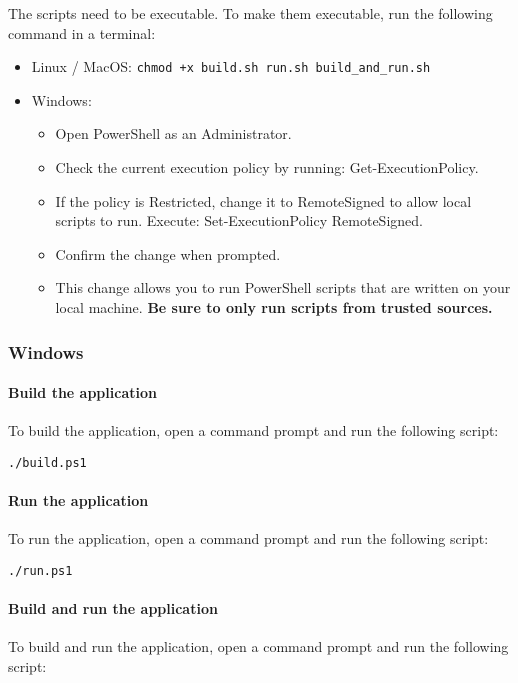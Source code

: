 \begin{bfhWarnBox}
	The scripts need to be executable. To make them executable, run the following command in a terminal:
	\begin{itemize}
		\item Linux / MacOS: \texttt{chmod +x build.sh run.sh build\_and\_run.sh}
		\item Windows: 
		\begin{itemize}
			\item Open PowerShell as an Administrator. 
			\item Check the current execution policy by running: Get-ExecutionPolicy. 
			\item If the policy is Restricted, change it to RemoteSigned to allow local scripts to run. Execute: Set-ExecutionPolicy RemoteSigned. 
			\item Confirm the change when prompted.
			\item This change allows you to run PowerShell scripts that are written on your local machine. \textbf{Be sure to only run scripts from trusted sources.}
		\end{itemize}
	\end{itemize}
\end{bfhWarnBox}

\subsubsection{Windows}

\paragraph{Build the application}
To build the application, open a command prompt and run the following script:

\begin{lstlisting}
./build.ps1
\end{lstlisting}

\paragraph{Run the application}
To run the application, open a command prompt and run the following script:

\begin{lstlisting}
./run.ps1
\end{lstlisting}

\paragraph{Build and run the application}
To build and run the application, open a command prompt and run the following script:

